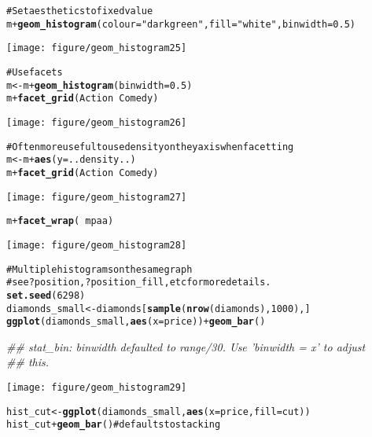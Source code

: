 \documentclass[a4paper,titlepage]{tufte-handout}\usepackage{graphicx, color}
\makeatletter
\def\maxwidth{ %
  \ifdim\Gin@nat@width>\linewidth
    \linewidth
  \else
    \Gin@nat@width
  \fi
}
\newcommand{\hlfunctioncall}[1]{\textcolor[rgb]{0.501960784313725,0,0.329411764705882}{\textbf{#1}}}%
\newcommand{\hlstring}[1]{\textcolor[rgb]{0.6,0.6,1}{#1}}%
\newcommand{\hlcomment}[1]{\textcolor[rgb]{0.180392156862745,0.6,0.341176470588235}{#1}}%
\newenvironment{kframe}{%
 \def\at@end@of@kframe{}%
 \ifinner\ifhmode%
  \def\at@end@of@kframe{\end{minipage}}%
  \begin{minipage}{\columnwidth}%
 \fi\fi%
 \def\FrameCommand##1{\hskip\@totalleftmargin \hskip-\fboxsep
 \colorbox{shadecolor}{##1}\hskip-\fboxsep
     \hskip-\linewidth \hskip-\@totalleftmargin \hskip\columnwidth}%
 \MakeFramed {\advance\hsize-\width
   \@totalleftmargin\z@ \linewidth\hsize
   \@setminipage}}%
 {\par\unskip\endMakeFramed%
 \at@end@of@kframe}
\newenvironment{knitrout}{}{} %
\makeatother
\begin{document}
\begin{knitrout}
\begin{kframe}
\begin{alltt}
\hlcomment{# Set aesthetics to fixed value}
m + \hlfunctioncall{geom_histogram}(colour = \hlstring{"darkgreen"}, fill = \hlstring{"white"}, binwidth = 0.5)
\end{alltt}
\end{kframe}\texttt{[image: figure/geom\_histogram25]} \begin{kframe}\begin{alltt}
\hlcomment{# Use facets}
m <- m + \hlfunctioncall{geom_histogram}(binwidth = 0.5)
m + \hlfunctioncall{facet_grid}(Action ~ Comedy)
\end{alltt}
\end{kframe}\texttt{[image: figure/geom\_histogram26]} \begin{kframe}\begin{alltt}
\hlcomment{# Often more useful to use density on the y axis when facetting}
m <- m + \hlfunctioncall{aes}(y = ..density..)
m + \hlfunctioncall{facet_grid}(Action ~ Comedy)
\end{alltt}
\end{kframe}\texttt{[image: figure/geom\_histogram27]} \begin{kframe}\begin{alltt}
m + \hlfunctioncall{facet_wrap}(~ mpaa)
\end{alltt}
\end{kframe}\texttt{[image: figure/geom\_histogram28]} \begin{kframe}\begin{alltt}
\hlcomment{# Multiple histograms on the same graph}
\hlcomment{# see ?position, ?position_fill, etc for more details.}
\hlfunctioncall{set.seed}(6298)
diamonds_small <- diamonds[\hlfunctioncall{sample}(\hlfunctioncall{nrow}(diamonds), 1000), ]
\hlfunctioncall{ggplot}(diamonds_small, \hlfunctioncall{aes}(x=price)) + \hlfunctioncall{geom_bar}()
\end{alltt}
\begin{flushleft}\ttfamily\noindent\itshape\textcolor{messagecolor}{\#\# stat\_bin: binwidth defaulted to range/30. Use 'binwidth = x' to adjust \\ 
\#\# this.}\end{flushleft}\end{kframe}\texttt{[image: figure/geom\_histogram29]} \begin{kframe}\begin{alltt}
hist_cut <- \hlfunctioncall{ggplot}(diamonds_small, \hlfunctioncall{aes}(x=price, fill=cut))
hist_cut + \hlfunctioncall{geom_bar}() \hlcomment{# defaults to stacking}

\end{alltt}
\end{kframe}
\end{knitrout}
\end{document}
